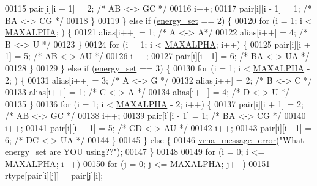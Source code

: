 \begin{DoxyCode}
00115         pair[i][i + 1] = 2;       \textcolor{comment}{/* AB <-> GC */}
00116         i++;
00117         pair[i][i - 1] = 1;       \textcolor{comment}{/* BA <-> CG */}
00118       \}
00119     \} \textcolor{keywordflow}{else} \textcolor{keywordflow}{if} (\mbox{\hyperlink{group__model__details_gafb1ef1166da85092ae8a325e02dcae71}{energy\_set}} == 2) \{
00120       \textcolor{keywordflow}{for} (i = 1; i < \mbox{\hyperlink{pair__mat_8h_a05a5ffe718aa431d97419a12fb082379}{MAXALPHA}}; ) \{
00121         alias[i++]  = 1;      \textcolor{comment}{/* A <-> A*/}
00122         alias[i++]  = 4;      \textcolor{comment}{/* B <-> U */}
00123       \}
00124       \textcolor{keywordflow}{for} (i = 1; i < \mbox{\hyperlink{pair__mat_8h_a05a5ffe718aa431d97419a12fb082379}{MAXALPHA}}; i++) \{
00125         pair[i][i + 1] = 5;       \textcolor{comment}{/* AB <-> AU */}
00126         i++;
00127         pair[i][i - 1] = 6;       \textcolor{comment}{/* BA <-> UA */}
00128       \}
00129     \} \textcolor{keywordflow}{else} \textcolor{keywordflow}{if} (\mbox{\hyperlink{group__model__details_gafb1ef1166da85092ae8a325e02dcae71}{energy\_set}} == 3) \{
00130       \textcolor{keywordflow}{for} (i = 1; i < \mbox{\hyperlink{pair__mat_8h_a05a5ffe718aa431d97419a12fb082379}{MAXALPHA}} - 2; ) \{
00131         alias[i++]  = 3;    \textcolor{comment}{/* A <-> G */}
00132         alias[i++]  = 2;    \textcolor{comment}{/* B <-> C */}
00133         alias[i++]  = 1;    \textcolor{comment}{/* C <-> A */}
00134         alias[i++]  = 4;    \textcolor{comment}{/* D <-> U */}
00135       \}
00136       \textcolor{keywordflow}{for} (i = 1; i < \mbox{\hyperlink{pair__mat_8h_a05a5ffe718aa431d97419a12fb082379}{MAXALPHA}} - 2; i++) \{
00137         pair[i][i + 1] = 2;     \textcolor{comment}{/* AB <-> GC */}
00138         i++;
00139         pair[i][i - 1] = 1;     \textcolor{comment}{/* BA <-> CG */}
00140         i++;
00141         pair[i][i + 1] = 5;     \textcolor{comment}{/* CD <-> AU */}
00142         i++;
00143         pair[i][i - 1] = 6;     \textcolor{comment}{/* DC <-> UA */}
00144       \}
00145     \} \textcolor{keywordflow}{else} \{
00146       \mbox{\hyperlink{group__utils_ga36b35be01d7f36cf7f59c245eee628d1}{vrna\_message\_error}}(\textcolor{stringliteral}{"What energy\_set are YOU using??"});
00147     \}
00148 
00149     \textcolor{keywordflow}{for} (i = 0; i <= \mbox{\hyperlink{pair__mat_8h_a05a5ffe718aa431d97419a12fb082379}{MAXALPHA}}; i++)
00150       \textcolor{keywordflow}{for} (j = 0; j <= \mbox{\hyperlink{pair__mat_8h_a05a5ffe718aa431d97419a12fb082379}{MAXALPHA}}; j++)
00151         rtype[pair[i][j]] = pair[j][i];

\end{DoxyCode}
